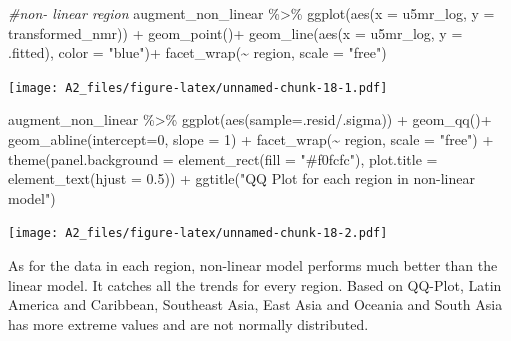 \documentclass[
]{article}
\newenvironment{Shaded}{\begin{snugshade}}{\end{snugshade}}
\newcommand{\AttributeTok}[1]{\textcolor[rgb]{0.77,0.63,0.00}{#1}}
\newcommand{\CommentTok}[1]{\textcolor[rgb]{0.56,0.35,0.01}{\textit{#1}}}
\newcommand{\DecValTok}[1]{\textcolor[rgb]{0.00,0.00,0.81}{#1}}
\newcommand{\FloatTok}[1]{\textcolor[rgb]{0.00,0.00,0.81}{#1}}
\newcommand{\FunctionTok}[1]{\textcolor[rgb]{0.00,0.00,0.00}{#1}}
\newcommand{\NormalTok}[1]{#1}
\newcommand{\SpecialCharTok}[1]{\textcolor[rgb]{0.00,0.00,0.00}{#1}}
\newcommand{\StringTok}[1]{\textcolor[rgb]{0.31,0.60,0.02}{#1}}
\begin{document}
\begin{Shaded}
\begin{Highlighting}[]
\CommentTok{\#non{-} linear region}
\NormalTok{augment\_non\_linear }\SpecialCharTok{\%\textgreater{}\%} 
  \FunctionTok{ggplot}\NormalTok{(}\FunctionTok{aes}\NormalTok{(}\AttributeTok{x =}\NormalTok{ u5mr\_log, }\AttributeTok{y =}\NormalTok{ transformed\_nmr)) }\SpecialCharTok{+}
  \FunctionTok{geom\_point}\NormalTok{()}\SpecialCharTok{+}
  \FunctionTok{geom\_line}\NormalTok{(}\FunctionTok{aes}\NormalTok{(}\AttributeTok{x =}\NormalTok{ u5mr\_log, }\AttributeTok{y =}\NormalTok{ .fitted), }\AttributeTok{color =} \StringTok{"blue"}\NormalTok{)}\SpecialCharTok{+}
  \FunctionTok{facet\_wrap}\NormalTok{(}\SpecialCharTok{\textasciitilde{}}\NormalTok{ region, }\AttributeTok{scale =} \StringTok{"free"}\NormalTok{)}
\end{Highlighting}
\end{Shaded}

\texttt{[image: A2\_files/figure-latex/unnamed-chunk-18-1.pdf]}

\begin{Shaded}
\begin{Highlighting}[]
\NormalTok{augment\_non\_linear }\SpecialCharTok{\%\textgreater{}\%} 
  \FunctionTok{ggplot}\NormalTok{(}\FunctionTok{aes}\NormalTok{(}\AttributeTok{sample=}\NormalTok{.resid}\SpecialCharTok{/}\NormalTok{.sigma)) }\SpecialCharTok{+}
  \FunctionTok{geom\_qq}\NormalTok{()}\SpecialCharTok{+}
  \FunctionTok{geom\_abline}\NormalTok{(}\AttributeTok{intercept=}\DecValTok{0}\NormalTok{, }\AttributeTok{slope =} \DecValTok{1}\NormalTok{) }\SpecialCharTok{+}
  \FunctionTok{facet\_wrap}\NormalTok{(}\SpecialCharTok{\textasciitilde{}}\NormalTok{ region, }\AttributeTok{scale =} \StringTok{"free"}\NormalTok{) }\SpecialCharTok{+} 
  \FunctionTok{theme}\NormalTok{(}\AttributeTok{panel.background =} \FunctionTok{element\_rect}\NormalTok{(}\AttributeTok{fill =} \StringTok{"\#f0fcfc"}\NormalTok{),}
        \AttributeTok{plot.title =} \FunctionTok{element\_text}\NormalTok{(}\AttributeTok{hjust =} \FloatTok{0.5}\NormalTok{)) }\SpecialCharTok{+}
  \FunctionTok{ggtitle}\NormalTok{(}\StringTok{"QQ Plot for each region in non{-}linear model"}\NormalTok{)}
\end{Highlighting}
\end{Shaded}

\texttt{[image: A2\_files/figure-latex/unnamed-chunk-18-2.pdf]}

As for the data in each region, non-linear model performs much better
than the linear model. It catches all the trends for every region. Based
on QQ-Plot, Latin America and Caribbean, Southeast Asia, East Asia and
Oceania and South Asia has more extreme values and are not normally
distributed.
\end{document}
